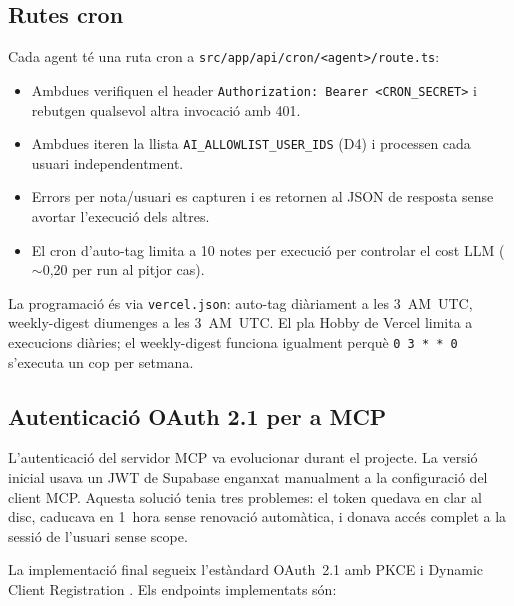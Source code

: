 \subsection{Rutes cron}

Cada agent té una ruta cron a \texttt{src/app/api/cron/<agent>/route.ts}:

\begin{itemize}
    \item Ambdues verifiquen el header \texttt{Authorization: Bearer <CRON\_SECRET>} i rebutgen qualsevol altra invocació amb 401.
    \item Ambdues iteren la llista \texttt{AI\_ALLOWLIST\_USER\_IDS} (D4) i processen cada usuari independentment.
    \item Errors per nota/usuari es capturen i es retornen al JSON de resposta sense avortar l'execució dels altres.
    \item El cron d'auto-tag limita a 10 notes per execució per controlar el cost LLM ($\sim$0{,}20\nobreakspace\texteuro{} per run al pitjor cas).
\end{itemize}

La programació és via \texttt{vercel.json}: auto-tag diàriament a les 3~AM~UTC, weekly-digest diumenges a les 3~AM~UTC. El pla Hobby de Vercel limita a execucions diàries; el weekly-digest funciona igualment perquè \texttt{0 3 * * 0} s'executa un cop per setmana.

\subsection{Autenticació OAuth 2.1 per a MCP}
\label{sec:impl-oauth-mcp}

L'autenticació del servidor MCP va evolucionar durant el projecte. La versió inicial usava un JWT de Supabase enganxat manualment a la configuració del client MCP. Aquesta solució tenia tres problemes: el token quedava en clar al disc, caducava en 1~hora sense renovació automàtica, i donava accés complet a la sessió de l'usuari sense scope.

La implementació final segueix l'estàndard OAuth~2.1 amb PKCE \parencite{rfc7636pkce} i Dynamic Client Registration \parencite{rfc7591dcr}. Els endpoints implementats són:

